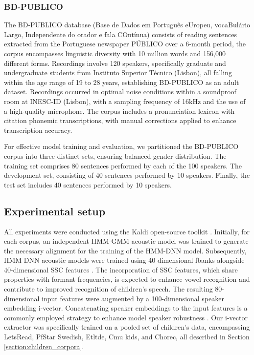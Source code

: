 \subsubsection*{BD-PUBLICO}
The BD-PUBLICO database (Base de Dados em Português eUropeu, vocaBulário Largo, Independente do orador e fala COntínua) \cite{bdpublico} consists of reading sentences extracted from the Portuguese newspaper PÚBLICO over a 6-month period, the corpus encompasses linguistic diversity with 10 million words and 156,000 different forms. Recordings involve 120 speakers, specifically graduate and undergraduate students from Instituto Superior Técnico (Lisbon), all falling within the age range of 19 to 28 years, establishing BD-PUBLICO as an adult dataset. Recordings occurred in optimal noise conditions within a soundproof room at INESC-ID (Lisbon), with a sampling frequency of 16kHz and the use of a high-quality microphone. The corpus includes a pronunciation lexicon with citation phonemic transcriptions, with manual corrections applied to enhance transcription accuracy.

For effective model training and evaluation, we partitioned the BD-PUBLICO corpus into three distinct sets, ensuring balanced gender distribution. The training set comprises 80 sentences performed by each of the 100 speakers. The development set, consisting of 40 sentences performed by 10 speakers. Finally, the test set includes 40 sentences performed by 10 speakers.


\subsection{Experimental setup}
\label{section:exp_setup}

All experiments were conducted using the Kaldi open-source toolkit \cite{kaldi}. Initially, for each corpus, an independent \ac{HMM-GMM} acoustic model was trained to generate the necessary alignment for the training of the \ac{HMM-DNN} model. Subsequently, \ac{HMM-DNN} acoustic models were trained using 40-dimensional \ac{fbanks} alongside 40-dimensional \ac{SSC} features \cite{ssc}. The incorporation of \ac{SSC} features, which share properties with formant frequencies, is expected to enhance vowel recognition and contribute to improved recognition of children's speech. The resulting 80-dimensional input features were augmented by a 100-dimensional speaker embedding i-vector. Concatenating speaker embeddings to the input features is a commonly employed strategy to enhance model speaker robustness \cite{ivector}. Our i-vector extractor was specifically trained on a pooled set of children's data, encompassing LetsRead, PfStar Swedish, Etltde, Cmu kids, and Chorec, all described in Section \ref{section:children_corpora}.

